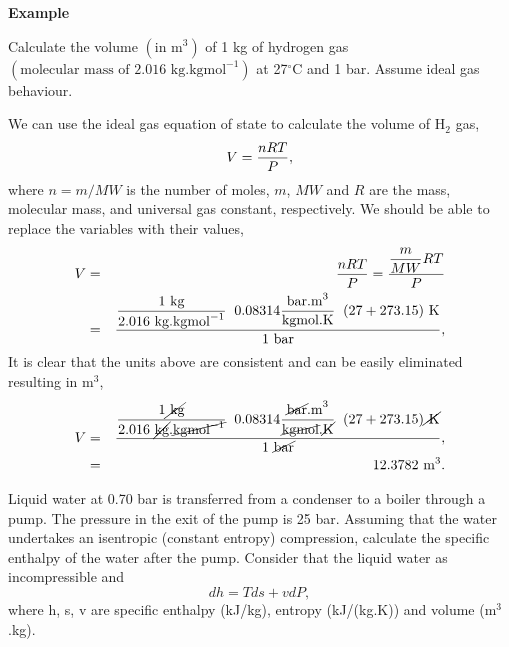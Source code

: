     
  \begin{MyExample}{\begin{center}{\bf Example}\end{center}}
     \begin{example}\label{Chapter:UnitConversion:Example1}
       Calculate the volume $\left(\text{in m}^{3}\right)$ of 1 kg of hydrogen gas $\left(\text{molecular mass of 2.016 kg.kgmol}^{-1}\right)$ at 27$^{\circ}$C and 1 bar. Assume ideal gas behaviour.
     \end{example}

      We can use the ideal gas equation of state to calculate the volume of H$_{2}$ gas,
           \begin{displaymath}
              V = \displaystyle\frac{nRT}{P},
           \end{displaymath}
           where $n = m/MW$ is the number of moles, $m$, $MW$ and $R$ are the mass, molecular mass, and universal gas constant, respectively. We should be able to replace the variables with their values,
           \begin{eqnarray}
              V &=& \displaystyle\frac{nRT}{P} = \displaystyle\frac{ \displaystyle\frac{m}{MW} R T }{ P } \nonumber \\
                &=& \displaystyle\frac{ \displaystyle\frac{ 1\text{ kg}}{ 2.016\text{ kg.kgmol}^{-1}}\;\; 0.08314\displaystyle\frac{\text{bar.m}^{3}}{\text{kgmol.K}}\;\; ( 27 + 273.15)\text{ K}}{ 1 \text{ bar}},\nonumber
           \end{eqnarray}
           It is clear that the units above are consistent and can be easily eliminated resulting in m$^{3}$,
           \begin{eqnarray}
              V &=& \displaystyle\frac{ \displaystyle\frac{ 1\cancel{\text{ kg}}}{ 2.016\text{ \cancel{kg}.}\cancel{\text{kgmol}^{-1}}}\;\; 0.08314\displaystyle\frac{\text{\cancel{bar}.m}^{3}}{\text{\cancel{kgmol}.\cancel{K}}}\;\; ( 27 + 273.15)\cancel{\text{ K}}}{ 1 \text{ \cancel{bar}}},\nonumber \\
                &=& 12.3782\text{ m}^{3}.\nonumber
           \end{eqnarray}
       \begin{example}\label{Chapter:UnitConversion:Example2}
              Liquid water at 0.70 bar is transferred from a condenser to a boiler through a pump. The pressure in the exit of the pump is 25 bar. Assuming that the water undertakes an isentropic (\ie constant entropy) compression, calculate the specific enthalpy of the water after the pump. Consider that the liquid water as incompressible and
          \begin{displaymath}
            dh = Tds + vdP,
         \end{displaymath}
         where h, s, v are specific enthalpy (kJ/kg), entropy (kJ/(kg.K)) and volume (m$^{3}$.kg).
     \end{example}


\end{MyExample}
